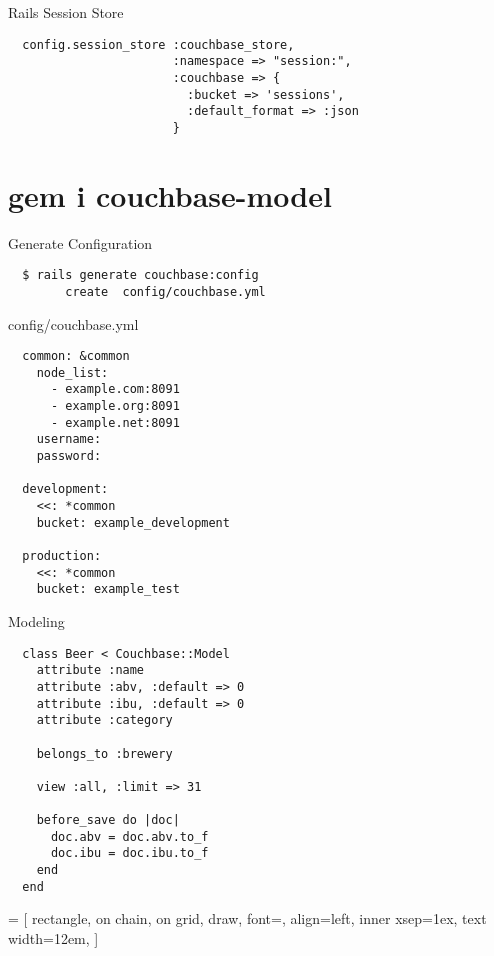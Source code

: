 \documentclass[aspectratio=43]{beamer}
\begin{document}
\begin{frame}[fragile]{Rails Session Store}
  \begin{verbatim}
  config.session_store :couchbase_store,
                       :namespace => "session:",
                       :couchbase => {
                         :bucket => 'sessions',
                         :default_format => :json
                       }
  \end{verbatim}
\end{frame}

\section{gem i couchbase-model}
\begin{frame}[fragile]{Generate Configuration}
  \begin{verbatim}
  $ rails generate couchbase:config
        create  config/couchbase.yml
  \end{verbatim}
\end{frame}

\begin{frame}[fragile]{config/couchbase.yml}
  \begin{verbatim}
  common: &common
    node_list:
      - example.com:8091
      - example.org:8091
      - example.net:8091
    username:
    password:

  development:
    <<: *common
    bucket: example_development

  production:
    <<: *common
    bucket: example_test
  \end{verbatim}
\end{frame}

\begin{frame}[fragile]{Modeling}
  \begin{verbatim}
  class Beer < Couchbase::Model
    attribute :name
    attribute :abv, :default => 0
    attribute :ibu, :default => 0
    attribute :category

    belongs_to :brewery

    view :all, :limit => 31

    before_save do |doc|
      doc.abv = doc.abv.to_f
      doc.ibu = doc.ibu.to_f
    end
  end
  \end{verbatim}
\end{frame}


 = [
  rectangle,
  on chain,
  on grid,
  draw,
  font=\ttfamily,
  align=left,
  inner xsep=1ex,
  text width=12em,
]
\end{document}
